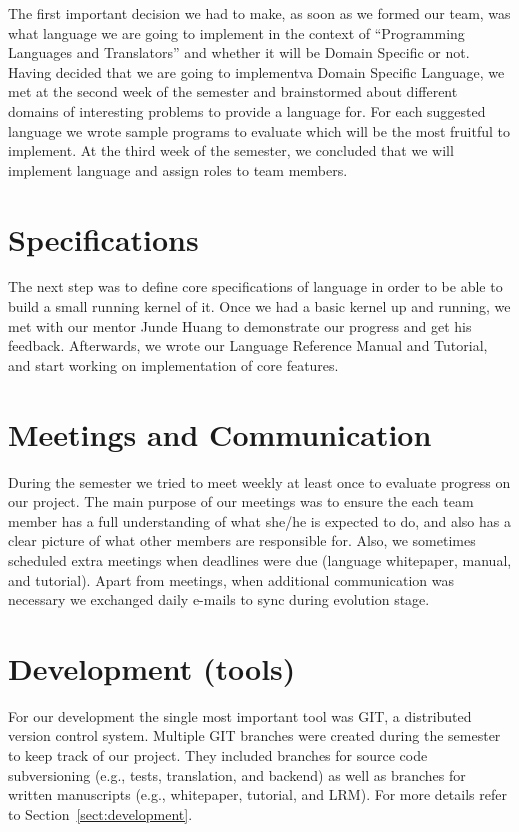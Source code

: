 The first important decision we had to make, as soon as we formed
our team, was what language we are going to implement in the context of
``Programming Languages and Translators'' and whether it will be Domain
Specific or not. Having decided that we are going to implementva Domain
Specific Language, we met at the second week of the semester and brainstormed
about different domains of interesting problems to provide a language for.
For each suggested language we wrote sample programs to evaluate which will be
the most fruitful to implement. At the third week of the semester, we concluded
that we will implement \lang{} language and assign roles to team members.

\section{Specifications}
The next step was to define core specifications of \lang{} language in order to
be able to build a small running kernel of it. Once we had a basic kernel up
and running, we met with our mentor Junde Huang to demonstrate our progress
and get his feedback. Afterwards, we wrote our Language Reference Manual and
Tutorial, and start working on implementation of core features.

\section{Meetings and Communication}
During the semester we tried to meet weekly at least once to evaluate progress
on our project. The main purpose of our meetings was to ensure the each team
member has a full understanding of what she/he is expected to do, and also has a
clear picture of what other members are responsible for. Also, we
sometimes scheduled extra meetings when deadlines were due (language whitepaper,
manual, and tutorial). Apart from meetings, when additional communication was
necessary we exchanged daily e-mails to sync during evolution stage.

\section{Development (tools)}
For our development the single most important tool was GIT, a distributed
version control system. Multiple GIT branches were created during the semester
to keep track of our project. They included branches for source code
subversioning (e.g., tests, translation, and \lang{} backend) as well as
branches for written manuscripts (e.g., whitepaper, tutorial,  and LRM).
For more details refer to Section~\ref{sect:development}.

